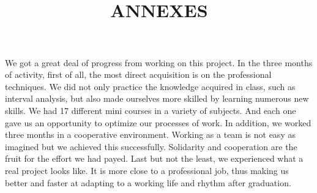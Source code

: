 \documentclass[a4paper]{report}
\begin{document}
We got a great deal of progress from working on this project. In the three months of activity, first of all, the most direct acquisition is on the professional techniques. We did not only practice the knowledge acquired in class, such as interval analysis, but also made ourselves more skilled by learning numerous new skills. We had 17 different mini courses in a variety of subjects. And each one gave us an opportunity to optimize our processes of work. In addition, we worked three months in a cooperative environment. Working as a team is not easy as imagined but we achieved this successfully. Solidarity and cooperation are the fruit for the effort we had payed.  Last but not the least, we experienced what a real project looks like. It is more close to a professional job, thus making us better and faster at adapting to a working life and rhythm after graduation.

\newpage
\nocite{*}










\newpage

	\begin{center}
		\title{ \HRule{} \\ [12cm]
				\LARGE \textbf{\uppercase{Annexes}}\\ [12cm]
				\HRule{}}
		\maketitle
	\end{center}
\end{document}

